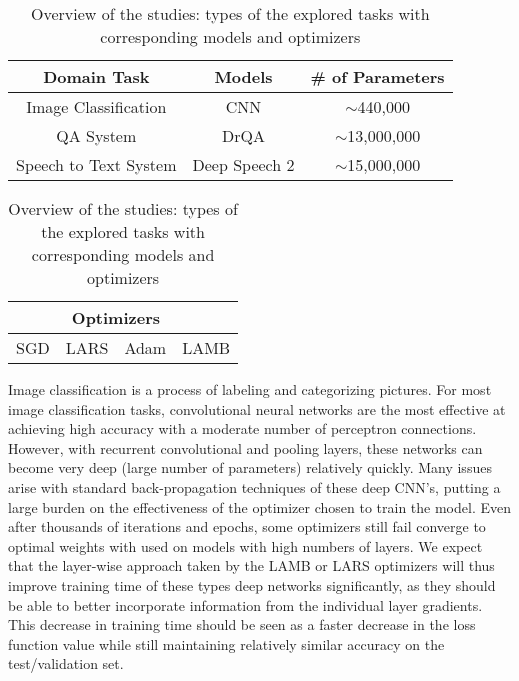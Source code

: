 \begin{table}[t]
\centering
\caption{Overview of the studies: types of the explored tasks with corresponding models and optimizers}
\label{tab:LargeBatch}
\begin{tabular}{ccc} 
 \toprule
\textbf{Domain Task} & \textbf{Models} & \textbf{\# of Parameters} \\
 \midrule
  Image Classification & CNN \cite{CNN} & $\sim$440,000 \\
  QA System & DrQA \cite{DrQA} & $\sim$13,000,000 \\ 
  Speech to Text System & Deep Speech 2 \cite{deepspeech} &  $\sim$15,000,000\\
  \bottomrule
\end{tabular}

\vspace{10pt}

\begin{tabular}{cccc} 
 \toprule
 &  \multicolumn{2}{c}{\textbf{Optimizers}} & \\
 \midrule
 SGD \cite{SGD} & LARS \cite{ginsburg2018large} & Adam \cite{adam}  &  LAMB \cite{You2020Large} \\
  \bottomrule
\end{tabular}
\end{table}

Image classification is a process of labeling and categorizing pictures. For most image classification tasks, convolutional neural networks are the most effective at achieving high accuracy with a moderate number of perceptron connections. However, with recurrent convolutional and pooling layers, these networks can become very deep (large number of parameters) relatively quickly\cite{CNN}. Many issues arise with standard back-propagation techniques of these deep CNN's, putting a large burden on the effectiveness of the optimizer chosen to train the model. Even after thousands of iterations and epochs, some optimizers still fail converge to optimal weights\cite{Sun2019OptimizationFD} with used on models with high numbers of layers. We expect that the layer-wise approach taken by the LAMB or LARS optimizers will thus improve training time of these types deep networks significantly, as they should be able to better incorporate information from the individual layer gradients. This decrease in training time should be seen as a faster decrease in the loss function value while still maintaining relatively similar accuracy on the test/validation set.


